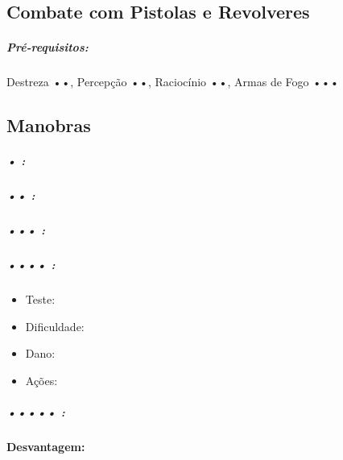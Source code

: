 
\subsection{\bf Combate com Pistolas e Revolveres}

\subparagraph*{\bf Pré-requisitos:} Destreza ••, Percepção ••, Raciocínio ••, Armas de Fogo •••

\subsection{\bf Manobras}

\subparagraph{\bf • :} 

\subparagraph{\bf •• :} 

\subparagraph{\bf ••• :}

\subparagraph{\bf •••• :} 

\begin{itemize}[noitemsep]
\item Teste:
\item Dificuldade: 
\item Dano: 
\item Ações: 
\end{itemize}

\subparagraph{\bf ••••• :}

{\bf Desvantagem:}

